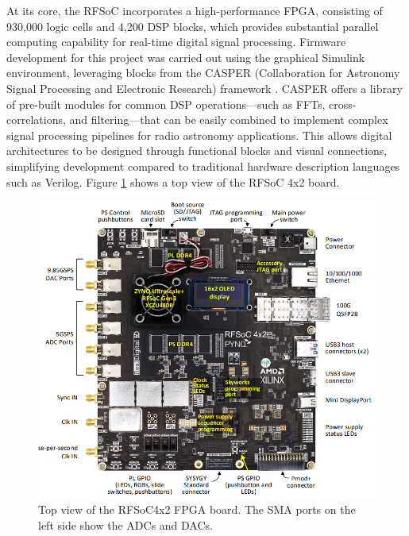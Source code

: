 At its core, the RFSoC incorporates a high-performance FPGA, consisting of 930,000 logic cells and 4,200 DSP blocks, which provides substantial parallel computing capability for real-time digital signal processing. Firmware development for this project was carried out using the graphical Simulink environment, leveraging blocks from the CASPER (Collaboration for Astronomy Signal Processing and Electronic Research) framework \citep{hickish2016decadedevelopingradioastronomyinstrumentation}. CASPER offers a library of pre-built modules for common DSP operations—such as FFTs, cross-correlations, and filtering—that can be easily combined to implement complex signal processing pipelines for radio astronomy applications.
This allows digital architectures to be designed through functional blocks and visual connections, simplifying development compared to traditional hardware description languages such as Verilog. Figure \ref{fig:rfsoc_top_view} shows a top view of the RFSoC 4x2 board.
\begin{figure}
	\centering
	\includegraphics[scale=0.58]{../figures/rfsoc.png}
	\caption[RFSoC4x2 top view]{Top view of the RFSoC4x2 FPGA board. The SMA ports on the left side show the ADCs and DACs.}
	\label{fig:rfsoc_top_view}
\end{figure}